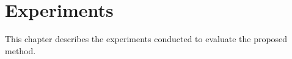 \chapter{Experiments}
\label{chapter:experiments}

\begin{ChapAbstract}
    This chapter describes the experiments conducted to evaluate the proposed method.
\end{ChapAbstract}






